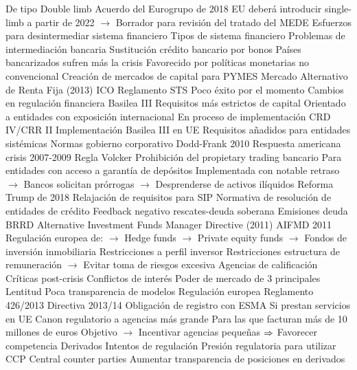 \documentclass{nuevotema}
\begin{document}
\begin{esquemal}
				\4[] De tipo Double limb
				\4 Acuerdo del Eurogrupo de 2018
				\4[] EU deberá introducir single-limb a partir de 2022
				\4[] $\to$ Borrador para revisión del tratado del MEDE
		\2 Esfuerzos para desintermediar sistema financiero
			\3 Tipos de sistema financiero
			\3 Problemas de intermediación bancaria
			\3 Sustitución crédito bancario por bonos
				\4 Países bancarizados sufren más la crisis
				\4 Favorecido por políticas monetarias no convencional
				\4 Creación de mercados de capital para PYMES
				\4 Mercado Alternativo de Renta Fija (2013)
				\4 ICO
				\4 Reglamento STS
				\4 Poco éxito por el momento
		\2 Cambios en regulación financiera
			\3 Basilea III
				\4 Requisitos más estrictos de capital
				\4 Orientado a entidades con exposición internacional
				\4 En proceso de implementación
			\3 CRD IV/CRR II
				\4 Implementación Basilea III en UE
				\4 Requisitos añadidos para entidades sistémicas
				\4 Normas gobierno corporativo
			\3 Dodd-Frank 2010
				\4 Respuesta americana crisis 2007-2009
				\4 Regla Volcker
				\4[] Prohibición del propietary trading bancario
				\4[] Para entidades con acceso a garantía de depósitos
				\4[] Implementada con notable retraso
				\4[] $\to$ Bancos solicitan prórrogas
				\4[] $\to$ Desprenderse de activos ilíquidos
				\4 Reforma Trump de 2018
				\4[] Relajación de requisitos para SIP
			\3 Normativa de resolución de entidades de crédito
				\4 Feedback negativo rescates-deuda soberana
				\4 Emisiones deuda 
				\4 BRRD
			\3 Alternative Investment Funds Manager Directive (2011)
				\4 AIFMD 2011
				\4 Regulación europea de:
				\4[] $\to$ Hedge funds
				\4[] $\to$ Private equity funds
				\4[] $\to$ Fondos de inversión inmobiliaria
				\4 Restricciones a perfil inversor
				\4 Restricciones estructura de remuneración
				\4[] $\to$ Evitar toma de riesgos excesiva
		\2 Agencias de calificación
			\3 Críticas post-crisis
				\4 Conflictos de interés
				\4 Poder de mercado de 3 principales
				\4 Lentitud
				\4 Poca transparencia de modelos
			\3 Regulación europea
				\4 Reglamento 426/2013
				\4 Directiva 2013/14
				\4 Obligación de registro con ESMA
				\4[] Si prestan servicios en UE
				\4 Canon regulatorio a agencias más grande
				\4[] Para las que facturan más de 10 millones de euros
				\4[] Objetivo
				\4[] $\to$ Incentivar agencias pequeñas
				\4[] $\Rightarrow$ Favorecer competencia
		\2 Derivados
			\3 Intentos de regulación
				\4 Presión regulatoria para utilizar CCP
				\4[] Central counter parties
				\4 Aumentar transparencia de posiciones en derivados

\end{esquemal}
\end{document}
